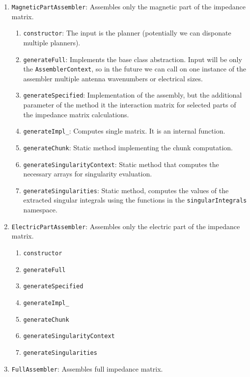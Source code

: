 \documentclass[9pt]{article}
\begin{document}
\begin{enumerate}[label=\Roman*.]
\begin{enumerate}[label=\roman*.]
        \end{enumerate}
        \item \texttt{MagneticPartAssembler}: Assembles only the magnetic part of the impedance matrix.
        \begin{enumerate}[label=\roman*.]
            \item \texttt{constructor}: The input is the planner (potentially we can disponate multiple planners).
            \item \texttt{generateFull}: Implements the base class abstraction. Input will be only the \texttt{AssemblerContext}, so in the future we can call on one instance of the assembler multiple antenna wavenumbers or electrical sizes.
            \item \texttt{generateSpecified}: Implementation of the assembly, but the additional parameter of the method it the interaction matrix for selected parts of the impedance matrix calculations.
            \item \texttt{generateImpl\_}: Computes single matrix. It is an internal function.
            \item \texttt{generateChunk}: Static method implementing the chunk computation.
            \item \texttt{generateSingularityContext}: Static method that computes the necessary arrays for singularity evaluation.
            \item \texttt{generateSingularities}: Static method, computes the values of the extracted singular integrals using the functions in the \texttt{singularIntegrals} namespace.
        \end{enumerate}
        \item \texttt{ElectricPartAssembler}: Assembles only the electric part of the impedance matrix.
        \begin{enumerate}[label=\roman*.]
            \item \texttt{constructor}
            \item \texttt{generateFull}
            \item \texttt{generateSpecified}
            \item \texttt{generateImpl\_}
            \item \texttt{generateChunk}
            \item \texttt{generateSingularityContext}
            \item \texttt{generateSingularities}
        \end{enumerate}
        \item \texttt{FullAssembler}: Assembles full impedance matrix.

\end{enumerate}
\end{document}
